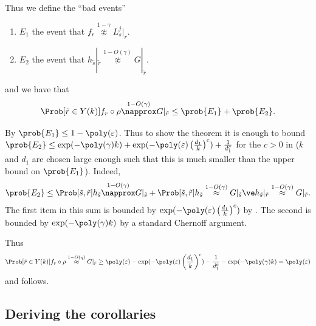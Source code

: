 Thus we define the ``bad events''
\begin{enumerate}
    \item \(E_1\) the event that \(f_r \overset{1-\gamma}{\napprox} L_s^j|_{r}\).
    \item \(E_2\) the event that \(h_{\tilde{s}}|_{\tilde{r}} \overset{1-O(\gamma)}{\napprox} G|_{\tilde{r}}\).
\end{enumerate}
and we have that 
\[\Prob[\tilde{r} \in Y(k)]{f_{r}\circ \rho \overset{1-O(\gamma)}{\napprox} G|_{\tilde{r}}} \leq \prob{E_1} + \prob{E_2}.\]

By  \(\prob{E_1} \leq 1-\poly(\varepsilon)\). Thus to show the theorem it is enough to bound \(\prob{E_2} \leq \exp(-\poly(\gamma)k) + \exp(-\poly(\varepsilon)\left ( \frac{d_1}{k} \right )^c )+\frac{1}{d_1^c}\) for the \(c>0\) in  (\(k\) and \(d_1\) are chosen large enough such that this is much smaller than the upper bound on \(\prob{E_1}\)). Indeed, 
\[\prob{E_2} \leq \Prob[\tilde{s},\tilde{r}]{h_{\tilde{s}} \overset{1-O(\gamma)}{\napprox} G|_{\tilde{s}} } + \Prob[\tilde{s},\tilde{r}]{h_{\tilde{s}} \overset{1-O(\gamma)}{\approx} G|_{\tilde{s}} \ve h_{\tilde{s}}|_{\tilde{r}} \overset{1-O(\gamma)}{\approx} G|_{\tilde{r}}}.\]
The first item in this sum is bounded by \(\exp(-\poly(\varepsilon)\left ( \frac{d_1}{k} \right )^c )\) by . The second is bounded by \(\exp(-\poly(\gamma)k)\) by a standard Chernoff argument.

Thus 
\[\Prob[\tilde{r} \in Y(k)]{f_{r}\circ \rho \overset{1-O(\eta)}{\approx} G|_{\tilde{r}}} \geq \poly(\varepsilon) - \exp(-\poly(\varepsilon)\left ( \frac{d_1}{k} \right )^c )-\frac{1}{d_1^c} - \exp(-\poly(\gamma)k) = \poly(\varepsilon)\]
and  follows.
    
\subsection{Deriving the corollaries}

